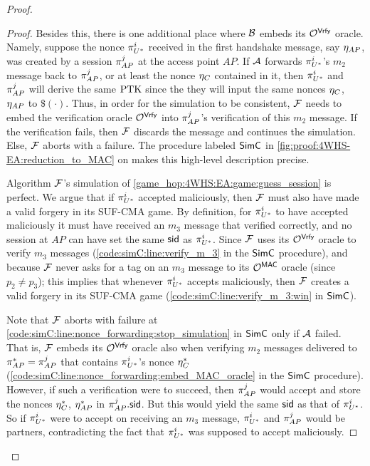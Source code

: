 \begin{proof}
\begin{proof}
Besides this,
there is one additional place where $\A[B]$ embeds its $\mathcal{O}^{\macvrfy}$ oracle.
Namely,
suppose the nonce $\eatarget$ received in the first handshake message,
say $\nonce_{AP}$, was created by a session $\oracle[AP][j]$ at the access point $AP$.
If $\A$ forwards $\eatarget$'s $m_2$ message back to $\oracle[AP][j]$,
or at least the nonce $\nonce_{C}$ contained in it,
then $\eatarget$ and $\oracle[AP][j]$ will derive the same $\PTK$
since the they will input the same nonces $\nonce_{C}$, $\nonce_{AP}$ to $\$(\cdot)$.
Thus,
in order for the simulation to be consistent,
$\A[F]$ needs to embed the verification oracle $\mathcal{O}^{\macvrfy}$ into $\oracle[AP][j]$'s verification of this $m_2$ message.
If the verification fails,
then $\A[F]$ discards the message and continues the simulation.
Else,
$\A[F]$ aborts with a failure.
The procedure labeled $\simC$ in \cref{fig:proof:4WHS-EA:reduction_to_MAC} on  makes this high-level description precise.





Algorithm $\A[F]$'s simulation of \cref{game_hop:4WHS:EA:game:guess_session} is perfect.
We argue that if $\eatarget$ accepted maliciously,
then $\A[F]$ must also have made a valid forgery in its SUF-CMA game.
By definition,
for $\eatarget$ to have accepted maliciously it must have received an $m_3$ message that verified correctly,
and no session at $AP$ can have set the same $\sid$ as $\eatarget$. 
Since $\A[F]$ uses its $\mathcal{O}^{\macvrfy}$ oracle to verify $m_3$ messages
(\cref{code:simC:line:verify_m_3} in the $\simC$ procedure),
and because $\A[F]$ never asks for a tag on an $m_3$ message to its $\mathcal{O}^{\mactag}$ oracle
(since $p_2 \neq p_3$);
this implies that whenever $\eatarget$ accepts maliciously,
then $\A[F]$ creates a valid forgery in its SUF-CMA game
(\cref{code:simC:line:verify_m_3:win} in $\simC$).

Note that $\A[F]$ aborts with failure at \cref{code:simC:line:nonce_forwarding:stop_simulation} in $\simC$ only if  $\A$ failed.
That is,
$\A[F]$ embeds its $\mathcal{O}^{\macvrfy}$ oracle also when verifying $m_2$ messages delivered to $\oracle[AP][*] = \oracle[AP][j]$ that contains $\eatarget$'s nonce $\nonce_{C}^*$ 
(\cref{code:simC:line:nonce_forwarding:embed_MAC_oracle} in the $\simC$ procedure).
However,
if such a verification were to succeed,
then $\oracle[AP][j]$ would accept and store the nonces $\nonce_{C}^*$, $\nonce_{AP}^*$ in $\oracle[AP][j].\sid$.
But this would yield the same $\sid$ as that of $\eatarget$.
So if $\eatarget$ were to accept on receiving an $m_3$ message,
$\eatarget$ and $\oracle[AP][j]$ would be partners,
contradicting the fact that $\eatarget$ was supposed to accept maliciously.










\end{proof}
\end{proof}
